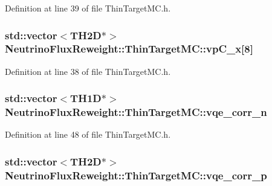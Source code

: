 Definition at line 39 of file Thin\-Target\-M\-C.\-h.

\hypertarget{class_neutrino_flux_reweight_1_1_thin_target_m_c_a612fb4d230b0d597e299f67c50a71461}{
\subsubsection[{vp\-C\-\_\-x}]{\setlength{\rightskip}{0pt plus 5cm}std\-::vector$<$T\-H2\-D$\ast$$>$ Neutrino\-Flux\-Reweight\-::\-Thin\-Target\-M\-C\-::vp\-C\-\_\-x\mbox{[}8\mbox{]}\hspace{0.3cm}{\ttfamily [private]}}}\label{class_neutrino_flux_reweight_1_1_thin_target_m_c_a612fb4d230b0d597e299f67c50a71461}


Definition at line 38 of file Thin\-Target\-M\-C.\-h.

\hypertarget{class_neutrino_flux_reweight_1_1_thin_target_m_c_a3ea82c76544072b252ab905193cd7711}{
\subsubsection[{vqe\-\_\-corr\-\_\-n}]{\setlength{\rightskip}{0pt plus 5cm}std\-::vector$<$T\-H1\-D$\ast$$>$ Neutrino\-Flux\-Reweight\-::\-Thin\-Target\-M\-C\-::vqe\-\_\-corr\-\_\-n\hspace{0.3cm}{\ttfamily [private]}}}\label{class_neutrino_flux_reweight_1_1_thin_target_m_c_a3ea82c76544072b252ab905193cd7711}


Definition at line 48 of file Thin\-Target\-M\-C.\-h.

\hypertarget{class_neutrino_flux_reweight_1_1_thin_target_m_c_afb3e3731f237e92476381c3e860c4ac9}{
\subsubsection[{vqe\-\_\-corr\-\_\-p}]{\setlength{\rightskip}{0pt plus 5cm}std\-::vector$<$T\-H2\-D$\ast$$>$ Neutrino\-Flux\-Reweight\-::\-Thin\-Target\-M\-C\-::vqe\-\_\-corr\-\_\-p\hspace{0.3cm}{\ttfamily [private]}}}\label{class_neutrino_flux_reweight_1_1_thin_target_m_c_afb3e3731f237e92476381c3e860c4ac9}



